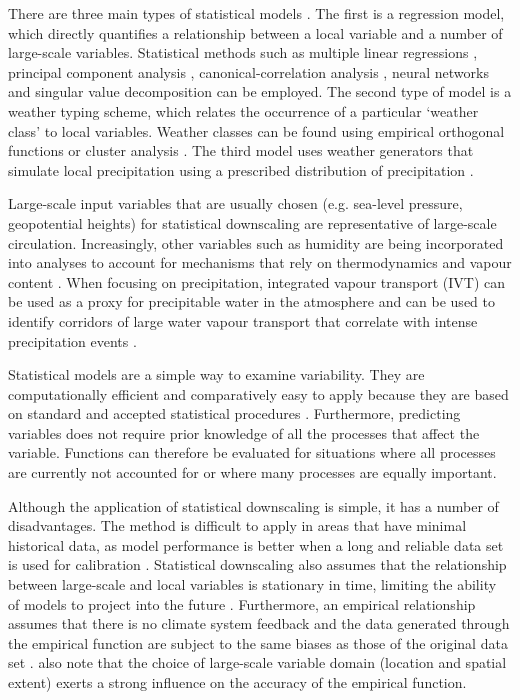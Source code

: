 \documentclass{sfuthesis}
\begin{document}
{\begin{appendices}
There are three main types of statistical models \citep{Fowler2007}. The first is a regression model, which directly quantifies a relationship between a local variable and a number of large-scale variables. Statistical methods such as multiple linear regressions \citep{Hanssen-Bauer1998}, principal component analysis \citep{Kidson1998}, canonical-correlation analysis \citep{Busuioc2001}, neural networks \citep{Zorita1999} and singular value decomposition \citep{Widmann2003} can be employed.  The second type of model is a weather typing scheme, which relates the occurrence of a particular `weather class' to local variables. Weather classes can be found using empirical orthogonal functions or cluster analysis \citep{Fowler2007}. The third model uses weather generators that simulate local precipitation using a prescribed distribution of precipitation \citep{Fowler2007}. 

Large-scale input variables that are usually chosen (e.g. sea-level pressure, geopotential heights) for statistical downscaling are representative of large-scale circulation. Increasingly, other variables such as humidity are being incorporated into analyses to account for mechanisms that rely on thermodynamics and vapour content \citep{Fowler2007}. When focusing on precipitation, integrated vapour transport (IVT) can be used as a proxy for precipitable water in the atmosphere and can be used to identify corridors of large water vapour transport that correlate with intense precipitation events \citep{Neiman2008}. 

Statistical models are a simple way to examine variability. They are computationally efficient and comparatively easy to apply because they are based on standard and accepted statistical procedures \citep{Fowler2007}. Furthermore, predicting variables does not require prior knowledge of all the processes that affect the variable. Functions can therefore be evaluated for situations where all processes are currently not accounted for or where many processes are equally important. 

Although the application of statistical downscaling is simple, it has a number of disadvantages. The method is difficult to apply in areas that have minimal historical data, as model performance is better when a long and reliable data set is used for calibration \citep{Fowler2007}. Statistical downscaling also assumes that the relationship between large-scale and local variables is stationary in time, limiting the ability of models to project into the future \citep{Fowler2007}. Furthermore, an empirical relationship assumes that there is no climate system feedback and the data generated through the empirical function are subject to the same biases as those of the original data set \citep{Fowler2007}. \cite{Wilby2000} also note that the choice of large-scale variable domain (location and spatial extent) exerts a strong influence on the accuracy of the empirical function.


\end{appendices}}
\end{document}

